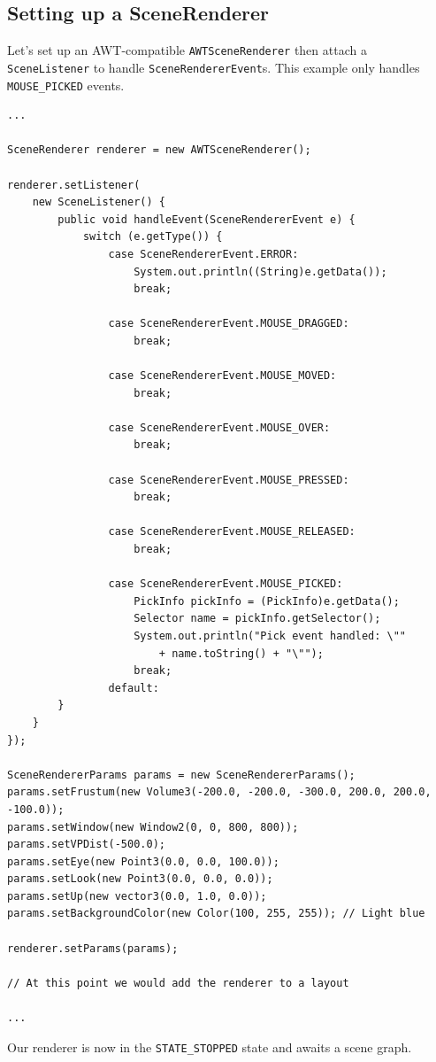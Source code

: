 \documentclass[10pt,aps, prb,preprint]{article}
\begin{document}
\subsection{Setting up a SceneRenderer}
Let's set up an AWT-compatible \texttt{AWTSceneRenderer} then attach a \texttt{SceneListener} to handle \texttt{SceneRendererEvent}s. This example only handles \texttt{MOUSE\_PICKED} events.
\begin{verbatim}
...

SceneRenderer renderer = new AWTSceneRenderer();

renderer.setListener(
    new SceneListener() {
        public void handleEvent(SceneRendererEvent e) {
            switch (e.getType()) {
                case SceneRendererEvent.ERROR:
                    System.out.println((String)e.getData());
                    break;

                case SceneRendererEvent.MOUSE_DRAGGED:
                    break;

                case SceneRendererEvent.MOUSE_MOVED:
                    break;

                case SceneRendererEvent.MOUSE_OVER:
                    break;

                case SceneRendererEvent.MOUSE_PRESSED:
                    break;

                case SceneRendererEvent.MOUSE_RELEASED:
                    break;

                case SceneRendererEvent.MOUSE_PICKED:
                    PickInfo pickInfo = (PickInfo)e.getData();
                    Selector name = pickInfo.getSelector();
                    System.out.println("Pick event handled: \"" 
                        + name.toString() + "\"");
                    break;
                default:
        }
    }
});
 
SceneRendererParams params = new SceneRendererParams();
params.setFrustum(new Volume3(-200.0, -200.0, -300.0, 200.0, 200.0, -100.0));
params.setWindow(new Window2(0, 0, 800, 800));
params.setVPDist(-500.0);
params.setEye(new Point3(0.0, 0.0, 100.0));
params.setLook(new Point3(0.0, 0.0, 0.0));
params.setUp(new vector3(0.0, 1.0, 0.0));
params.setBackgroundColor(new Color(100, 255, 255)); // Light blue

renderer.setParams(params);

// At this point we would add the renderer to a layout

...

\end{verbatim}
Our renderer is now in the \texttt{STATE\_STOPPED} state and awaits a scene graph. 
\end{document}

